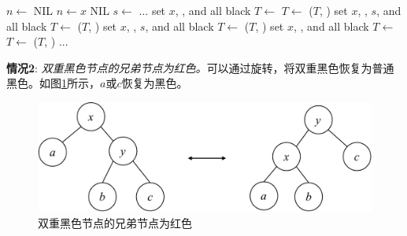 \documentclass[b5paper]{ctexart}
\begin{document}
\begin{algorithmic}[1]
  \State $n \gets$ NIL
    
    \State $n \gets x$
  \EndIf
   
    \State \Return NIL
  \EndIf
     
        \State $s \gets$ 
        \State ...
            \State set $x$, , and  all black
            \State $T \gets$ 
            \State $T \gets$ ($T$, )
          \Else {}
            \State set $x$, , $s$, and  all black
            \State $T \gets$ ($T$, )
          \EndIf
           
            \State set $x$, , $s$, and  all black
            \State $T \gets$ ($T$, )
          \Else {}
            \State set $x$, , and  all black
            \State $T \gets$ 
            \State $T \gets$ ($T$, )
          \EndIf
        \State ...
        \EndIf
    \EndIf
  \EndWhile
\EndFunction
\end{algorithmic}

\textbf{情况2}: {\em 双重黑色节点的兄弟节点为红色。}可以通过旋转，将双重黑色恢复为普通黑色。如图\cref{fig:del-case2}所示，$a$或$c$恢复为黑色。

\begin{figure}[htbp]
  \centering
  \includegraphics[scale=0.4, page=4]{../../../datastruct/tree/red-black-tree/img/rbtree}
  \caption{双重黑色节点的兄弟节点为红色}
  \label{fig:del-case2}
\end{figure}
\end{document}
